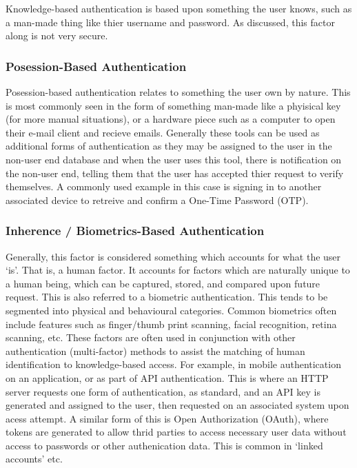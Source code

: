 \documentclass[11pt, english]{article}
\begin{document}
	Knowledge-based authentication is based upon something the user knows, such as a man-made thing like thier username and password. As discussed, this factor along is not very secure.

		\subsubsection{Posession-Based Authentication}

	Posession-based authentication relates to something the user own by nature. This is most commonly seen in the form of something man-made like a phyisical key (for more manual situations), or a hardware piece such as a computer to open their e-mail client and recieve emails. Generally these tools can be used as additional forms of authentication as they may be assigned to the user in the non-user end database and when the user uses this tool, there is notification on the non-user end, telling them that the user has accepted thier request to verify themselves. A commonly used example in this case is signing in to another associated device to retreive and confirm a One-Time Password (OTP).

		\subsubsection{Inherence / Biometrics-Based Authentication}

	Generally, this factor is considered something which accounts for what the user `is'. That is, a human factor. It accounts for factors which are naturally unique to a human being, which can be captured, stored, and compared upon future request. This is also referred to a biometric authentication. This tends to be segmented into physical and behavioural categories. Common biometrics often include features such as finger/thumb print scanning, facial recognition, retina scanning, etc. These factors are often used in conjunction with other authentication (multi-factor) methods to assist the matching of human identification to knowledge-based access. For example, in mobile authentication on an application, or as part of API authentication. This is where an HTTP server requests one form of authentication, as standard, and an API key is generated and assigned to the user, then requested on an associated system upon acess attempt. A similar form of this is Open Authorization (OAuth), where tokens are generated to allow thrid parties to access necessary user data without access to passwords or other authenication data. This is common in `linked accounts' etc.\\
\end{document}
